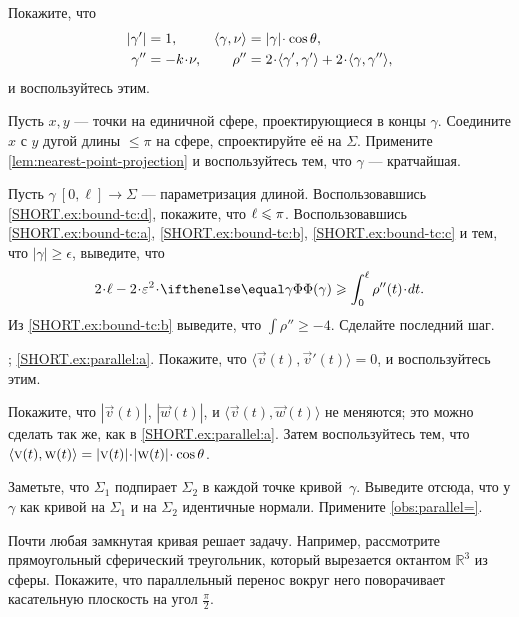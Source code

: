 \begin{multicols}{2}
Покажите, что
\begin{align*}
|\gamma'|&= 1,
&
\langle\gamma,\Norm\rangle&=|\gamma|\cdot\cos\theta,
\\
\gamma''&=-k\cdot \Norm,
&
\rho''&=2\cdot \langle\gamma',\gamma'\rangle+2\cdot \langle\gamma,\gamma''\rangle,
\end{align*}
и воспользуйтесь этим.

Пусть $x,y$ --- точки на единичной сфере, проектирующиеся в концы $\gamma$. 
Соедините $x$ с $y$ дугой длины $\le \pi$ на сфере, спроектируйте её на $\Sigma$.
Примените \ref{lem:nearest-point-projection} и воспользуйтесь тем, что $\gamma$ --- кратчайшая.

Пусть $\gamma\:[0,\ell]\to\Sigma$ --- параметризация длиной.
Воспользовавшись \ref{SHORT.ex:bound-tc:d}, покажите, что $\ell\z\le \pi$.
Воспользовавшись \ref{SHORT.ex:bound-tc:a}, \ref{SHORT.ex:bound-tc:b}, \ref{SHORT.ex:bound-tc:c} и тем, что $|\gamma|\ge \epsilon$, выведите, что 
\[2\cdot \ell-2\cdot \epsilon^2\cdot \tc{\gamma}
\ge
\int_0^\ell\rho''(t)\cdot dt.\]
Из \ref{SHORT.ex:bound-tc:b} выведите, что $\int\rho''\ge -4$.
Сделайте последний шаг.

 
\setcounter{eqtn}{0}

\parbf{\ref{ex:parallel}}; \ref{SHORT.ex:parallel:a}.
Покажите, что $\langle\vec v(t),\vec v'(t)\rangle=0$, и воспользуйтесь этим.

\parit{\ref{SHORT.ex:parallel:b}}
Покажите, что $|\vec v(t)|$, $|\vec w(t)|$, и
$\langle\vec v(t),\vec w(t)\rangle$
не меняются; это можно сделать так же, как в \ref{SHORT.ex:parallel:a}.
Затем воспользуйтесь тем, что 
$\langle\vec v(t),\vec w(t)\rangle\z=|\vec v(t)|\cdot|\vec w(t)|\cdot\cos\theta$.

Заметьте, что $\Sigma_1$ подпирает $\Sigma_2$ в каждой точке кривой~$\gamma$.
Выведите отсюда, что у $\gamma$ как кривой на $\Sigma_1$ и на $\Sigma_2$ идентичные нормали.
Примените \ref{obs:parallel=}.

Почти любая замкнутая кривая решает задачу.
Например, рассмотрите прямоугольный сферический треугольник, который вырезается октантом $\mathbb{R}^3$ из сферы.
Покажите, что параллельный перенос вокруг него поворачивает касательную плоскость на угол $\tfrac\pi 2$.


\end{multicols}
